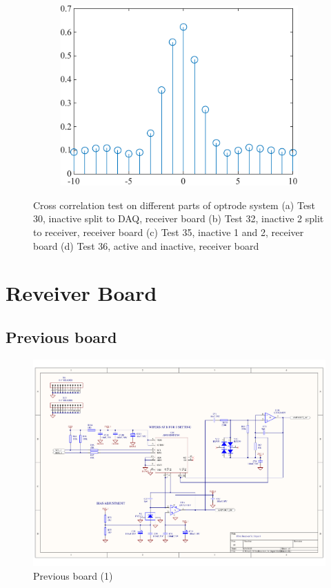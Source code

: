 \begin{figure}[H]
\begin{subfigure}{.5\textwidth}
  \caption{}
  \label{fig_CrossCorrelation35}
\end{subfigure}%
\begin{subfigure}{.5\textwidth}
  \centering
  \includegraphics[width=0.8\linewidth]{4-ANC_Sys/CrossCorrelation 36.pdf}
  \caption{}
  \label{fig_CrossCorrelation36}
\end{subfigure}
\caption{Cross correlation test on different parts of optrode system (a) Test 30, inactive split to DAQ, receiver board (b) Test 32, inactive 2 split to receiver, receiver board (c) Test 35, inactive 1 and 2, receiver board (d) Test 36, active and inactive, receiver board}
\label{fig_CrossCorrelationTest}
\end{figure}



\section{Reveiver Board}

\subsection{Previous board}

\begin{figure}[h]
\centering
\includegraphics[width=0.9\linewidth]{4-ANC_Sys/FibreReceiver_3c_Input1.pdf}
\caption{Previous board (1)}
\label{fig_DavidBoardIn}
\end{figure}

